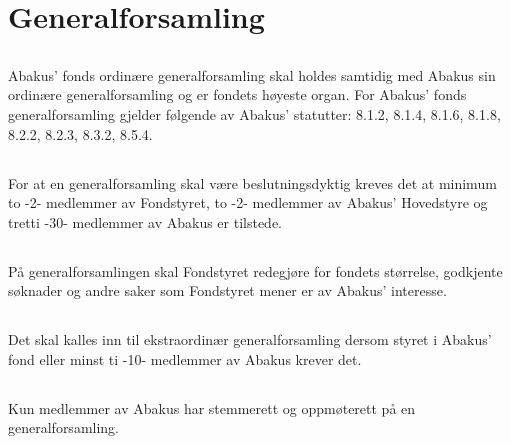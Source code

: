 \section{Generalforsamling}

\subsection{}
Abakus’ fonds ordinære generalforsamling skal holdes samtidig med Abakus sin
ordinære generalforsamling og er fondets høyeste organ. For Abakus’ fonds
generalforsamling gjelder følgende av Abakus’ statutter: 8.1.2, 8.1.4, 8.1.6,
8.1.8, 8.2.2, 8.2.3, 8.3.2, 8.5.4.

\subsection{}
For at en generalforsamling skal være beslutningsdyktig kreves det at minimum
to -2- medlemmer av Fondstyret, to -2- medlemmer av Abakus’ Hovedstyre og tretti
-30- medlemmer av Abakus er tilstede.

\subsection{}
På generalforsamlingen skal Fondstyret redegjøre for fondets størrelse,
godkjente søknader og andre saker som Fondstyret mener er av Abakus’
interesse.

\subsection{}
Det skal kalles inn til ekstraordinær generalforsamling dersom styret i
Abakus’ fond eller minst ti -10- medlemmer av Abakus krever det.

\subsection{}
Kun medlemmer av Abakus har stemmerett og oppmøterett på en generalforsamling.
